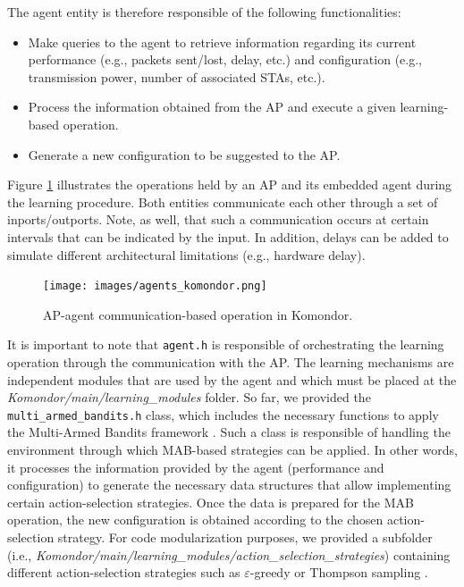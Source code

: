 \documentclass[a4paper]{article}
\begin{document}
The agent entity is therefore responsible of the following functionalities:
\begin{itemize}
	\item Make queries to the agent to retrieve information regarding its current performance (e.g., packets sent/lost, delay, etc.) and configuration (e.g., transmission power, number of associated STAs, etc.).
	\item Process the information obtained from the AP and execute a given learning-based operation.
	\item Generate a new configuration to be suggested to the AP.
\end{itemize} 

Figure \ref{fig:agents_komondor} illustrates the operations held by an AP and its embedded agent during the learning procedure. Both entities communicate each other through a set of inports/outports. Note, as well, that such a communication occurs at certain intervals that can be indicated by the input. In addition, delays can be added to simulate different architectural limitations (e.g., hardware delay). 

\begin{figure}[h]
	\centering
	\texttt{[image: images/agents\_komondor.png]}
	\caption{AP-agent communication-based operation in Komondor.}    
	\label{fig:agents_komondor}
\end{figure}

It is important to note that \texttt{agent.h} is responsible of orchestrating the learning operation through the communication with the AP. The learning mechanisms are independent modules that are used by the agent and which must be placed at the \textit{Komondor/main/learning\_modules} folder. So far, we provided the \texttt{multi\_armed\_bandits.h} class, which includes the necessary functions to apply the Multi-Armed Bandits framework \cite{auer2002finite}. Such a class is responsible of handling the environment through which MAB-based strategies can be applied. In other words, it processes the information provided by the agent (performance and configuration) to generate the necessary data structures that allow implementing certain action-selection strategies. Once the data is prepared for the MAB operation, the new configuration is obtained according to the chosen action-selection strategy. For code modularization purposes, we provided a subfolder (i.e., \textit{Komondor/main/learning\_modules/action\_selection\_strategies}) containing different action-selection strategies such as $\varepsilon$-greedy \cite{sutton1998reinforcement} or Thompson sampling \cite{thompson1933likelihood}.
\end{document}
